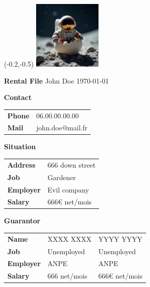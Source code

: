 \newpage
\thispagestyle{empty}


\begin{textblock}{10}(-0.2,-0.5)  %
    \includegraphics[width=0.25\textwidth]{doc/tenant/photo.png}
\end{textblock}

\vspace{0mm}
{\center\color{white} 
{\Huge \textbf{Rental File}}
\newPar
{\Large John Doe}
\newPar
{\Large \today}\\
}
\vspace{40mm}


{\large
\lipsum[1]
\newPar

\lineh

\textbf{Contact}\\
\newPar
\begin{tabularx}{\textwidth}{p{4cm}X}
\textbf{Phone} & 06.00.00.00.00\\
\textbf{Mail} & john.doe@mail.fr
\end{tabularx}
\newPar

\lineh

\textbf{Situation}\\
\newPar
\begin{tabularx}{\textwidth}{p{4cm}X}
\textbf{Address} & 666 down street\\
\textbf{Job} & Gardener\\
\textbf{Employer} & Evil company\\
\textbf{Salary} & 666€ net/mois
\end{tabularx}
\newPar

\lineh

\textbf{Guarantor}
\newPar
\begin{tabularx}{\textwidth}{p{4cm}XX}
\textbf{Name} & XXXX XXXX & YYYY YYYY\\
\textbf{Job} & Unemployed & Unemployed\\
\textbf{Employer} & ANPE & ANPE\\
\textbf{Salary} & 666 net/mois & 666€ net/mois\\
\end{tabularx}
}